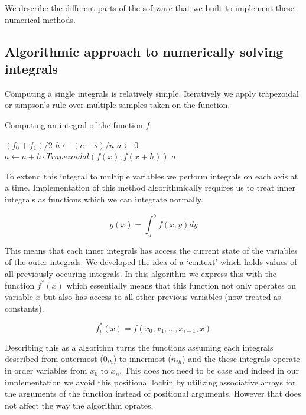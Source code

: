 \documentclass[12pt]{article}
\begin{document}
We describe the different parts of the software that we built to implement these numerical methods.

\subsection{Algorithmic approach to numerically solving integrals}

Computing a single integrals is relatively simple. Iteratively we apply trapezoidal or simpson's rule over multiple
samples taken on the function.

\begin{algorithm}
	\caption{Computing an integral of the function $f$.}
	\begin{algorithmic}[1]
		\State \Return $(f_0 + f_1)/2$
		\EndProcedure
		\Statex
		\State $h \gets (e - s) / n$
		\State $a \gets 0$
		\State $a \gets a + h \cdot Trapezoidal(f(x), f(x + h))$
		\EndFor
		\State \Return $a$
		\EndProcedure
	\end{algorithmic}
\end{algorithm}

To extend this integral to multiple variables we perform integrals on each axis at a time. Implementation of this method
algorithmically requires us to treat inner integrals as functions which we can integrate normally.

$$ g(x) = \int_a^b f(x, y) dy $$

This means that each inner integrals has access the current state of the variables of the outer integrals. We developed
the idea of a `context' which holds values of all previously occuring integrals. In this algorithm we express this with
the function $f^*(x)$ which essentially means that this function not only operates on variable $x$ but also has access
to all other previous variables (now treated as constants).

$$ f^*_i(x) = f(x_0, x_1, ..., x_{i-1}, x)$$

Describing this as a algorithm turns the functions assuming each integrals described from outermost ($0_{th}$) to innermost ($n_{th}$) and the 
these integrals operate in order variables from $x_0$ to $x_n$. This does not need to be case and indeed in our implementation we avoid this
positional lockin by utilizing associative arrays for the arguments of the function instead of positional arguments. However that does not affect
the way the algorithm oprates,
\end{document}
